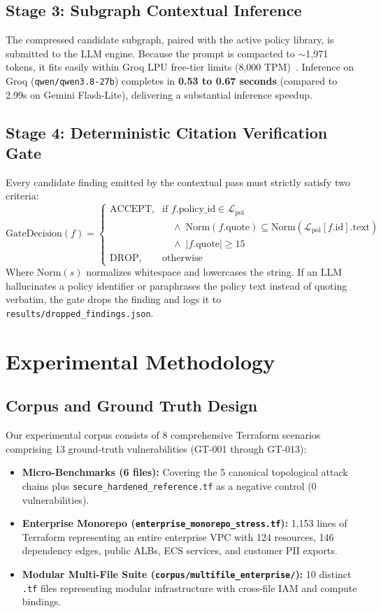 \documentclass[conference]{IEEEtran}
\begin{document}
\subsection{Stage 3: Subgraph Contextual Inference}
The compressed candidate subgraph, paired with the active policy library, is submitted to the LLM engine. Because the prompt is compacted to $\sim$1,971 tokens, it fits easily within Groq LPU free-tier limits (8,000 TPM)~\cite{groq_lpu}. Inference on Groq (\texttt{qwen/qwen3.8-27b}) completes in \textbf{0.53 to 0.67 seconds} (compared to 2.99s on Gemini Flash-Lite), delivering a substantial inference speedup.

\subsection{Stage 4: Deterministic Citation Verification Gate}
Every candidate finding emitted by the contextual pass must strictly satisfy two criteria:
\begin{equation}
\text{GateDecision}(f) = 
\begin{cases} 
\text{ACCEPT}, & \text{if } f.\text{policy\_id} \in \mathcal{L}_{\text{pol}} \\
&\quad \land\; \text{Norm}(f.\text{quote}) \subseteq \text{Norm}(\mathcal{L}_{\text{pol}}[f.\text{id}].\text{text}) \\
&\quad \land\; |f.\text{quote}| \ge 15 \\ 
\text{DROP}, & \text{otherwise} 
\end{cases}
\end{equation}
Where $\text{Norm}(s)$ normalizes whitespace and lowercases the string. If an LLM hallucinates a policy identifier or paraphrases the policy text instead of quoting verbatim, the gate drops the finding and logs it to \texttt{results/dropped\_findings.json}.

\section{Experimental Methodology}

\subsection{Corpus and Ground Truth Design}
Our experimental corpus consists of 8 comprehensive Terraform scenarios comprising 13 ground-truth vulnerabilities (GT-001 through GT-013):
\begin{itemize}
    \item \textbf{Micro-Benchmarks (6 files):} Covering the 5 canonical topological attack chains plus \texttt{secure\_hardened\_reference.tf} as a negative control (0 vulnerabilities).
    \item \textbf{Enterprise Monorepo (\texttt{enterprise\_monorepo\_stress.tf}):} 1,153 lines of Terraform representing an entire enterprise VPC with 124 resources, 146 dependency edges, public ALBs, ECS services, and customer PII exports.
    \item \textbf{Modular Multi-File Suite (\texttt{corpus/multifile\_enterprise/}):} 10 distinct \texttt{.tf} files representing modular infrastructure with cross-file IAM and compute bindings.
\end{itemize}
\end{document}
